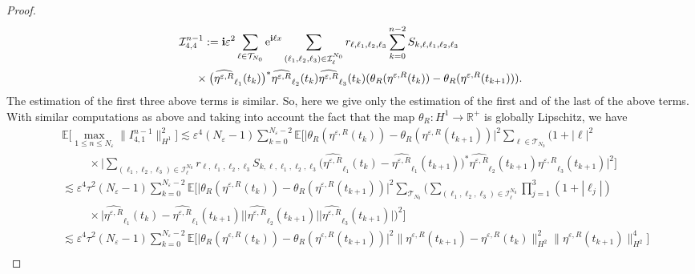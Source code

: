 \documentclass[a4paper]{amsart}
\begin{document}
\begin{proof}
\begin{align*}
    &\mathcal{I}_{4,4}^{n-1}:={\bf i}\varepsilon^2 \sum_{\ell\in\mathcal{T}_{N_0}}{\rm e}^{{\bf i}\ell x}\sum_{(\ell_1,\ell_2,\ell_3)\in\mathcal{I}_{\ell}^{N_0}}
    r_{\ell,\ell_1,\ell_2,\ell_3}\sum_{k=0}^{n-2}S_{k,\ell,\ell_1,\ell_2,\ell_3}\\
    &\hspace{0.5cm}\times \big(\widehat{\eta^{\varepsilon,R}}_{\ell_1}(t_{k})\big)^*\widehat{\eta^{\varepsilon,R}}_{\ell_2}(t_{k})\widehat{\eta^{\varepsilon,R}}_{\ell_3}(t_{k})(\theta_R(\eta^{\varepsilon,R}(t_k))-\theta_R(\eta^{\varepsilon,R}(t_{k+1}))).
   \end{align*}
   The estimation of the first three above terms is similar. So, here we give only the estimation of the first and of the last of the above terms. With similar computations as above and taking into account the fact that the map $\theta_R: H^1\to \mathbb{R}^+$ is globally Lipschitz, we have
   \begin{align*}
       &\mathbb{E}\big[\max_{1\le n\le N_\varepsilon}\|I_{4,1}^{n-1}\|^2_{H^1}\big]\lesssim\varepsilon^4 (N_\varepsilon-1) \sum_{k=0}^{N_\varepsilon-2}\mathbb{E}\big[\big|\theta_R(\eta^{\varepsilon,R}(t_k))-\theta_R(\eta^{\varepsilon,R}(t_{k+1}))\big|^2\sum_{\ell\in\mathcal{T}_{N_0}} (1+|\ell|^2\\
       &\hspace{1cm}\times \big|\sum_{(\ell_1,\ell_2,\ell_3)\in\mathcal{I}_{\ell}^{N_0}}r_{\ell,\ell_1,\ell_2,\ell_3}S_{k,\ell,\ell_1,\ell_2,\ell_3}
       \big(\widehat{\eta^{\varepsilon,R}}_{\ell_1}(t_{k})-\widehat{\eta^{\varepsilon,R}}_{\ell_1}(t_{k+1})\big)^*\widehat{\eta^{\varepsilon,R}}_{\ell_2}(t_{k+1})\widehat{\eta^{\varepsilon,R}}_{\ell_3}(t_{k+1})\big|^2\big]\\
       &\lesssim \varepsilon^4 \tau^2 (N_\varepsilon-1)\sum_{k=0}^{N_\varepsilon-2}\mathbb{E}\big[\big|\theta_R(\eta^{\varepsilon,R}(t_k))-\theta_R(\eta^{\varepsilon,R}(t_{k+1}))\big|^2\sum_{\mathcal{T}_{N_0}}\big(\sum_{(\ell_1,\ell_2,\ell_3)\in\mathcal{I}_{\ell}^{N_0}}\prod_{j=1}^{3}(1+|\ell_j|)\\
       &\hspace{1cm}\times \big|\widehat{\eta^{\varepsilon,R}}_{\ell_1}(t_{k})-\widehat{\eta^{\varepsilon,R}}_{\ell_1}(t_{k+1})\big| \big|\widehat{\eta^{\varepsilon,R}}_{\ell_2}(t_{k+1})\big| \big|\widehat{\eta^{\varepsilon,R}}_{\ell_3}(t_{k+1})\big| \big)^2\big]\\
       &\lesssim  \varepsilon^4 \tau^2 (N_\varepsilon-1)\sum_{k=0}^{N_\varepsilon-2}\mathbb{E}\big[\big|\theta_R(\eta^{\varepsilon,R}(t_k))-\theta_R(\eta^{\varepsilon,R}(t_{k+1}))\big|^2 \|\eta^{\varepsilon,R}(t_{k+1})-\eta^{\varepsilon,R}(t_{k})\|_{H^2}^2 \|\eta^{\varepsilon,R}(t_{k+1})\|^4_{H^2}\big]\\

\end{align*}
\end{proof}
\end{document}
